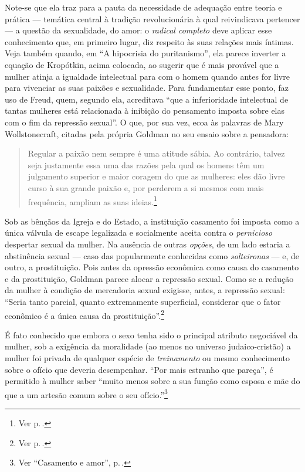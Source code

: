 Note-se que ela traz para a pauta da
necessidade de adequação entre teoria e prática --- temática central à
tradição revolucionária à qual reivindicava pertencer --- a questão
da sexualidade, do amor: o \textit{radical completo} deve aplicar esse
conhecimento que, em primeiro lugar, diz respeito às suas relações mais
íntimas. Veja também quando, em ``A hipocrisia do puritanismo'', ela
parece inverter a equação de Kropótkin, acima colocada, ao sugerir que é
mais provável que a mulher atinja a igualdade intelectual para com o
homem quando antes for livre para vivenciar as suas paixões e
sexualidade. Para fundamentar esse ponto, faz uso de Freud, quem,
segundo ela, acreditava ``que a inferioridade intelectual de tantas
mulheres está relacionada à inibição do pensamento imposta sobre elas
com o fim da repressão sexual''. O que, por sua vez, ecoa às palavras de
Mary Wollstonecraft, citadas pela própria Goldman no seu ensaio sobre a
pensadora:

\begin{quote}
Regular a paixão nem sempre é uma atitude sábia. Ao contrário, talvez
seja justamente essa uma das razões pela qual os homens têm um
julgamento superior e maior coragem do que as mulheres: eles dão livre
curso à sua grande paixão e, por perderem a si mesmos com mais
frequência, ampliam as suas ideias.\footnote{Ver p.\,\pageref{regular}.}
\end{quote}

Sob as bênçãos da Igreja e do Estado, a instituição casamento foi
imposta como a única válvula de escape legalizada e socialmente aceita
contra o \textit{pernicioso} despertar sexual da mulher. Na ausência de
outras \textit{opções}, de um lado estaria a abstinência sexual --- caso
das popularmente conhecidas como \textit{solteironas} --- e, de outro, a
prostituição. Pois antes da opressão econômica como causa do casamento e
da prostituição, Goldman parece alocar a repressão sexual. Como se a
redução da mulher à condição de mercadoria sexual exigisse,
antes, a repressão sexual: ``Seria tanto parcial, quanto
extremamente superficial, considerar que o fator econômico é a única
causa da prostituição''.\footnote{Ver p.\,\pageref{parcial}.}

É fato conhecido que embora o sexo tenha
sido o principal atributo negociável da mulher, sob a
exigência da moralidade (ao menos no universo
judaico-cristão) a mulher foi privada de qualquer espécie de
\textit{treinamento} ou mesmo conhecimento sobre o ofício que
deveria desempenhar. ``Por mais estranho que pareça'',
é permitido à mulher saber ``muito
menos sobre a sua função como esposa e mãe do que a um artesão comum
sobre o seu ofício.''\footnote{Ver ``Casamento e amor'', p.\,\pageref{artesao}.}

